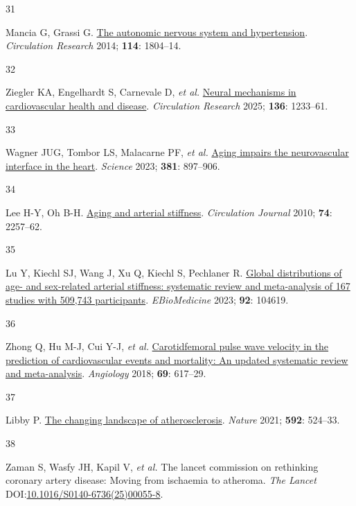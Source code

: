 \documentclass[
  letterpaper,
  headsepline=true,
  open=any]{scrbook}
\newlength{\cslhangindent}
\newlength{\csllabelwidth}
\newlength{\cslentryspacingunit} %
\newenvironment{CSLReferences}[2] %
 {%
  \setlength{\parindent}{0pt}
  \ifodd #1
  \let\oldpar\par
  \def\par{\hangindent=\cslhangindent\oldpar}
  \fi
  \setlength{\parskip}{#2\cslentryspacingunit}
 }%
 {}
\newcommand{\CSLLeftMargin}[1]{\parbox[t]{\csllabelwidth}{#1}}
\newcommand{\CSLRightInline}[1]{\parbox[t]{\linewidth - \csllabelwidth}{#1}\break}
\begin{document}
\begin{CSLReferences}{0}{0}
\leavevmode{}%
\CSLLeftMargin{31 }%
\CSLRightInline{Mancia G, Grassi G.
\href{https://doi.org/10.1161/CIRCRESAHA.114.302524}{The autonomic
nervous system and hypertension}. \emph{Circulation Research} 2014;
\textbf{114}: 1804--14.}

\leavevmode{}%
\CSLLeftMargin{32 }%
\CSLRightInline{Ziegler KA, Engelhardt S, Carnevale D, \emph{et al.}
\href{https://doi.org/10.1161/CIRCRESAHA.125.325580}{Neural mechanisms
in cardiovascular health and disease}. \emph{Circulation Research} 2025;
\textbf{136}: 1233--61.}

\leavevmode{}%
\CSLLeftMargin{33 }%
\CSLRightInline{Wagner JUG, Tombor LS, Malacarne PF, \emph{et al.}
\href{https://doi.org/10.1126/science.ade4961}{Aging impairs the
neurovascular interface in the heart}. \emph{Science} 2023;
\textbf{381}: 897--906.}

\leavevmode{}%
\CSLLeftMargin{34 }%
\CSLRightInline{Lee H-Y, Oh B-H.
\href{https://doi.org/10.1253/circj.CJ-10-0910}{Aging and arterial
stiffness}. \emph{Circulation Journal} 2010; \textbf{74}: 2257--62.}

\leavevmode{}%
\CSLLeftMargin{35 }%
\CSLRightInline{Lu Y, Kiechl SJ, Wang J, Xu Q, Kiechl S, Pechlaner R.
\href{https://doi.org/10.1016/j.ebiom.2023.104619}{Global distributions
of age- and sex-related arterial stiffness: systematic review and
meta-analysis of 167 studies with 509,743 participants}.
\emph{EBioMedicine} 2023; \textbf{92}: 104619.}

\leavevmode{}%
\CSLLeftMargin{36 }%
\CSLRightInline{Zhong Q, Hu M-J, Cui Y-J, \emph{et al.}
\href{https://doi.org/10.1177/0003319717742544}{Carotid{\textendash}femoral
pulse wave velocity in the prediction of cardiovascular events and
mortality: An updated systematic review and meta-analysis}.
\emph{Angiology} 2018; \textbf{69}: 617--29.}

\leavevmode{}%
\CSLLeftMargin{37 }%
\CSLRightInline{Libby P.
\href{https://doi.org/10.1038/s41586-021-03392-8}{The changing landscape
of atherosclerosis}. \emph{Nature} 2021; \textbf{592}: 524--33.}

\leavevmode{}%
\CSLLeftMargin{38 }%
\CSLRightInline{Zaman S, Wasfy JH, Kapil V, \emph{et al.} The lancet
commission on rethinking coronary artery disease: Moving from ischaemia
to atheroma. \emph{The Lancet}
DOI:\href{https://doi.org/10.1016/S0140-6736(25)00055-8}{10.1016/S0140-6736(25)00055-8}.}


\end{CSLReferences}
\end{document}
